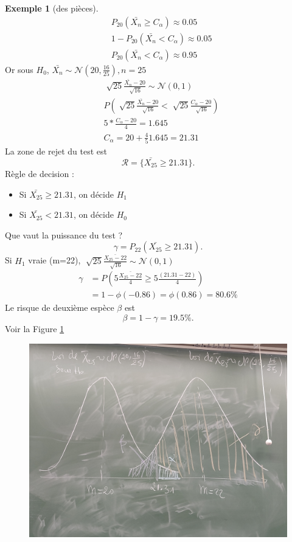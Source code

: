 \documentclass{article}
\theoremstyle{plain}%
\theoremstyle{definition}
\newtheorem{exmp}{Exemple}[section]
\theoremstyle{remark}
\begin{document}
\begin{exmp}[des pièces]
    \begin{align*}
        & P_{20}(\bar{X_n} \geq C_\alpha ) \approx 0.05 \\
        & 1 - P_{20} (\bar{X_n} < C_\alpha ) \approx 0.05 \\
        & P_{20} (\bar{X_n} < C_\alpha ) \approx 0.95
    \end{align*}
    Or sous $ H_0 $, $ \bar{X_n} \sim \mathcal{N}(20, \frac{16}{25}), n=25$
    \begin{align*}
        & \sqrt[]{25} \frac{\bar{X_n} - 20 }{\sqrt[]{16}} \sim \mathcal{N}(0,1) \\
        & P(\sqrt[]{25} \frac{\bar{X_n} - 20 }{\sqrt[]{16}} < \sqrt[]{25} \frac{C_\alpha - 20}{\sqrt[]{16}}) \\
        & 5 * \frac{C_\alpha - 20 }{4} = 1.645 \\
        & C_\alpha = 20 + \frac{4}{5}1.645 = 21.31
    \end{align*}
    La zone de rejet du test est 
    \[
        \mathcal{R} = \{\bar{X_{25}} \geq 21.31\}
    .\]
    Règle de decision : 
    \begin{itemize}
        \item Si $ \bar{X_{25}} \geq 21.31 $, on décide $ H_1 $ 
        \item Si $ \bar{X_{25}} < 21.31 $, on décide $ H_0 $ 
    \end{itemize}
    Que vaut la puissance du test ? 
    \[
        \gamma = P_{22}(\bar{X_{25}} \geq  21.31)
    .\]
    Si $ H_1 $ vraie (m=22), $ \sqrt[]{25}\frac{\bar{X_{25} - 22}}{\sqrt[]{16}} \sim \mathcal{N}(0,1) $
    \begin{align*}
        \gamma &= P(5 \frac{\bar{X_{25} - 22}}{4} \geq 5 \frac{(21.31 - 22)}{4})\\
            &= 1 - \phi (-0.86) = \phi (0.86) = 80.6 \%
    \end{align*}
    Le risque de deuxième espèce $ \beta  $ est 
    \[
        \beta = 1 - \gamma = 19.5\%
    .\]
    Voir la Figure \ref{fig1}
    \begin{figure}[!htbp]
        \centering
        \includegraphics*[width=.5\textwidth]{./Figure2/fig1.jpg}
        \label{fig1}
    \end{figure}
\end{exmp}
\end{document}
